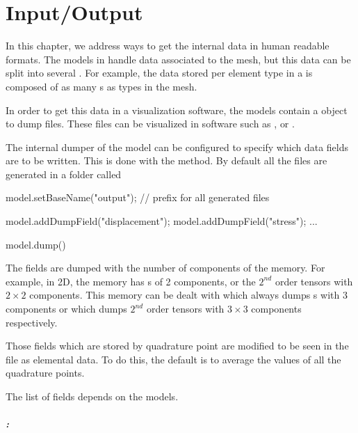 
\chapter{Input/Output}

In this chapter, we address ways to get the internal data in human readable formats.
The models in \akantu handle data associated to the
mesh, but this data can be split into several . For example, the
data stored per element type in a  is composed of as
many s as types in the mesh.

In order to get this data in a visualization software, the models contain a
object to dump  files. These files can be visualized in software such
as \cite{paraview}, \cite{visit} or \cite{mayavi}.

The internal dumper of the model can be configured to specify which data fields
are to be written. This is done with the
 method. By default all the files
are generated in a folder called 

\begin{cpp}
  model.setBaseName("output"); // prefix for all generated files

  model.addDumpField("displacement");
  model.addDumpField("stress");
  ...

  model.dump()
\end{cpp}

The fields are dumped with the number of components of the memory. For example, in 2D, the memory has 
s of 2 components, or the $2^{nd}$ order tensors with $2\times2$ components.  
This memory can be dealt with  which always dumps
s with 3 components or  which dumps $2^{nd}$
order tensors with $3\times3$ components respectively.

Those fields which are stored by quadrature point are modified to be seen in the
 file as elemental data. To do this, the default is to average the
values of all the quadrature points.

The list of fields depends on the models.

\paragraph{:}\hfill
\vspace*{0.2cm}

